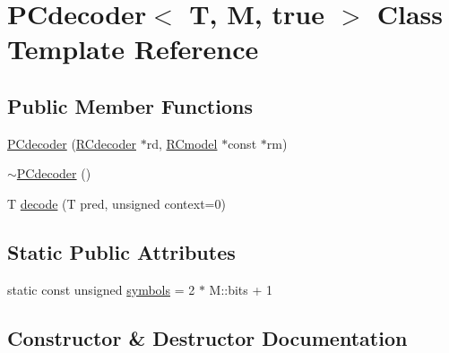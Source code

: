 \hypertarget{class_p_cdecoder_3_01_t_00_01_m_00_01true_01_4}{}\section{P\+Cdecoder$<$ T, M, true $>$ Class Template Reference}
\label{class_p_cdecoder_3_01_t_00_01_m_00_01true_01_4}
\subsection*{Public Member Functions}
\begin{DoxyCompactItemize}
\item 
\hyperlink{class_p_cdecoder_3_01_t_00_01_m_00_01true_01_4_ab44a2d2a99baf42a853559d433b12431}{P\+Cdecoder} (\hyperlink{class_r_cdecoder}{R\+Cdecoder} $\ast$rd, \hyperlink{class_r_cmodel}{R\+Cmodel} $\ast$const $\ast$rm)
\item 
\hyperlink{class_p_cdecoder_3_01_t_00_01_m_00_01true_01_4_aa12908f2f389b74aa8bc25c1c4dcfc77}{$\sim$\+P\+Cdecoder} ()
\item 
T \hyperlink{class_p_cdecoder_3_01_t_00_01_m_00_01true_01_4_ad8bcc64be2dc607c2c5065c89eb65fe4}{decode} (T pred, unsigned context=0)
\end{DoxyCompactItemize}
\subsection*{Static Public Attributes}
\begin{DoxyCompactItemize}
\item 
static const unsigned \hyperlink{class_p_cdecoder_3_01_t_00_01_m_00_01true_01_4_a81e2a7f084f2b56d559ff9f29cffcc87}{symbols} = 2 $\ast$ M\+::bits + 1
\end{DoxyCompactItemize}


\subsection{Constructor \& Destructor Documentation}
\hypertarget{class_p_cdecoder_3_01_t_00_01_m_00_01true_01_4_ab44a2d2a99baf42a853559d433b12431}{}
